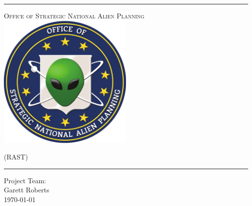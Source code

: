\begin{titlepage}
\begin{center}

\rule{\linewidth}{0.5mm}

\textsc{\large Office of Strategic National Alien Planning}
~\\[1cm]
\includegraphics[width=0.5\textwidth]{./osnap_logo.pdf}~\\[1cm]

{\Huge \linespread{2}}

\vspace{10pt}

\textsc{\Large (RAST)}

\rule{\linewidth}{0.5mm}

\vfill

Project Team:\\
Garett Roberts\\

\vfill
{\large \today}

\end{center}
\end{titlepage}
